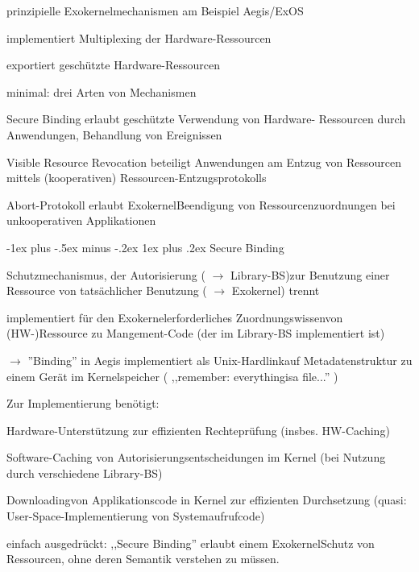 \documentclass[a4paper]{article}
\makeatletter
\renewcommand{\subsubsection}{\@startsection{subsubsection}{3}{0mm}%
 {-1ex plus -.5ex minus -.2ex}%
 {1ex plus .2ex}%
 {\normalfont\small\bfseries}}
\makeatother
\begin{document}
\begin{multicols}{3}
\begin{itemize*}
\begin{itemize*}
        \end{itemize*}
        \item prinzipielle Exokernelmechanismen am Beispiel Aegis/ExOS
        \begin{description*}
            \item[implementiert] Multiplexing der Hardware-Ressourcen
            \item[exportiert] geschützte Hardware-Ressourcen
        \end{description*}
        \item minimal: drei Arten von Mechanismen
    \end{itemize*}
    \begin{description*}
        \item[Secure Binding] erlaubt geschützte Verwendung von Hardware- Ressourcen durch Anwendungen, Behandlung von Ereignissen
        \item[Visible Resource Revocation] beteiligt Anwendungen am Entzug von Ressourcen mittels (kooperativen) Ressourcen-Entzugsprotokolls
        \item[Abort-Protokoll] erlaubt ExokernelBeendigung von Ressourcenzuordnungen bei unkooperativen Applikationen
    \end{description*}


    \subsubsection{Secure Binding}

    \begin{itemize*}
        \item Schutzmechanismus, der Autorisierung ( $\rightarrow$
        Library-BS)zur Benutzung einer Ressource von tatsächlicher Benutzung
        ( $\rightarrow$ Exokernel) trennt
        \item implementiert für den Exokernelerforderliches Zuordnungswissenvon
        (HW-)Ressource zu Mangement-Code (der im Library-BS implementiert ist)
        \item $\rightarrow$ ''Binding'' in Aegis implementiert als
        Unix-Hardlinkauf Metadatenstruktur zu einem Gerät im Kernelspeicher (
        ,,remember: everythingisa file...'' )
        \item Zur Implementierung benötigt:
        \begin{itemize*}
            \item Hardware-Unterstützung zur effizienten Rechteprüfung (insbes. HW-Caching)
            \item Software-Caching von Autorisierungsentscheidungen im Kernel (bei Nutzung durch verschiedene Library-BS)
            \item Downloadingvon Applikationscode in Kernel zur effizienten Durchsetzung (quasi: User-Space-Implementierung von Systemaufrufcode)
        \end{itemize*}
        \item einfach ausgedrückt: ,,Secure Binding'' erlaubt einem ExokernelSchutz
        von Ressourcen, ohne deren Semantik verstehen zu müssen.
    \end{itemize*}



\end{multicols}
\end{document}
